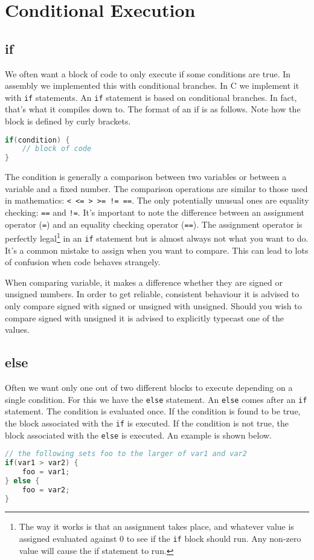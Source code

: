 \chapter{Conditional Execution}
\section{if}
We often want a block of code to only execute if some conditions are true. In assembly we implemented this with conditional branches. In C we implement it with \texttt{if} statements.
An \texttt{if} statement is based on conditional branches. In fact, that's what it compiles down to. The format of an if is as follows. Note how the block is defined by curly brackets. 

\begin{lstlisting}[language=C]
if(condition) {
    // block of code
}
\end{lstlisting}

The condition is generally a comparison between two variables or between a variable and a fixed number. The comparison operations are similar to those used in mathematics: \texttt{< <= > >= != ==}. 
The only potentially unusual ones are equality checking: \texttt{==} and \texttt{!=}. 
It's important to note the difference between an assignment operator (\texttt{=}) and an equality checking operator (\texttt{==}). 
The assignment operator is perfectly legal\footnote{The way it works is that an assignment takes place, and whatever value is assigned evaluated against 0 to see if the \texttt{if} block should run. Any non-zero value will cause the if statement to run.} in an \texttt{if} statement but is almost always not what you want to do. 
It's a common mistake to assign when you want to compare. 
This can lead to lots of confusion when code behaves strangely. 

When comparing variable, it makes a difference whether they are signed or unsigned numbers. In order to get reliable, consistent behaviour it is advised to only compare signed with signed or unsigned with unsigned. Should you wish to compare signed with unsigned it is advised to explicitly typecast one of the values. 

\section{else}
Often we want only one out of two different blocks to execute depending on a single condition. 
For this we have the \texttt{else} statement. 
An \texttt{else} comes after an \texttt{if} statement. 
The condition is evaluated once. 
If the condition is found to be true, the block associated with the \texttt{if} is executed. 
If the condition is not true, the block associated with the \texttt{else} is executed. An example is shown below.

\begin{lstlisting}[language=C]
// the following sets foo to the larger of var1 and var2
if(var1 > var2) {
    foo = var1;
} else {
    foo = var2;
}
\end{lstlisting}
